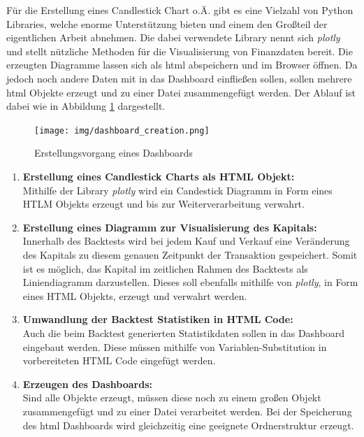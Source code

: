 \documentclass[oneside]{ausarbeitung}
\begin{document}
Für die Erstellung eines Candlestick Chart o.Ä. gibt es eine Vielzahl von Python Libraries, welche enorme Unterstützung bieten und einem den Großteil der eigentlichen Arbeit abnehmen. Die dabei verwendete Library nennt sich \textit{plotly} und stellt nützliche Methoden für die Visualisierung von Finanzdaten bereit. Die erzeugten Diagramme lassen sich als \ac{html} abspeichern und im Browser öffnen. Da jedoch noch andere Daten mit in das Dashboard einfließen sollen, sollen mehrere \ac{html} Objekte erzeugt und zu einer Datei zusammengefügt werden. Der Ablauf ist dabei wie in Abbildung \ref{fig:18} dargestellt.

\begin{figure}[H]
  \centering
  \texttt{[image: img/dashboard\_creation.png]}
  \caption{Erstellungsvorgang eines Dashboards}
  \label{fig:18}
\end{figure}

\begin{enumerate}
	\item \textbf{Erstellung eines Candlestick Charts als HTML Objekt:} \\
		Mithilfe der Library \textit{plotly} wird ein Candestick Diagramm in Form
		eines HTLM Objekts erzeugt und bis zur Weiterverarbeitung verwahrt.
	\item \textbf{Erstellung eines Diagramm zur Visualisierung des Kapitals:} \\
		Innerhalb des Backtests wird bei jedem Kauf und Verkauf eine Veränderung
		des Kapitals zu diesem genauen Zeitpunkt der Transaktion gespeichert.
		Somit ist es möglich, das Kapital im zeitlichen Rahmen des Backtests als
		Liniendiagramm darzustellen. Dieses soll ebenfalls mithilfe von
		\textit{plotly}, in Form eines HTML Objekts, erzeugt und verwahrt werden.
	\item \textbf{Umwandlung der Backtest Statistiken in HTML Code:} \\
		Auch die beim Backtest generierten Statistikdaten sollen in das Dashboard
		eingebaut werden. Diese müssen mithilfe von Variablen-Substitution in
		vorbereiteten HTML Code eingefügt werden.
	\item \textbf{Erzeugen des Dashboards:} \\
		Sind alle Objekte erzeugt, müssen diese noch zu einem großen Objekt
		zusammengefügt und zu einer Datei verarbeitet werden. Bei der Speicherung
		des \ac{html} Dashboards wird gleichzeitig eine geeignete Ordnerstruktur
		erzeugt.
\end{enumerate}
\end{document}
